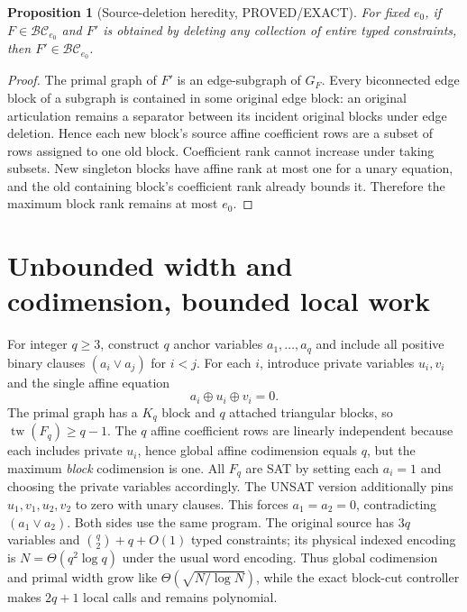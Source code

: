 \documentclass[10pt]{article}
\newtheorem{proposition}[theorem]{Proposition}
\newcommand{\tw}{\operatorname{tw}}
\begin{document}
\begin{proposition}[Source-deletion heredity, PROVED/EXACT]\label{prop:her}
For fixed $e_0$, if $F\in\mathcal{BC}_{e_0}$ and $F'$ is obtained by deleting any collection of entire typed constraints, then $F'\in\mathcal{BC}_{e_0}$.
\end{proposition}
\begin{proof}
The primal graph of $F'$ is an edge-subgraph of $G_F$. Every biconnected edge block of a subgraph is contained in some original edge block: an original articulation remains a separator between its incident original blocks under edge deletion. Hence each new block's source affine coefficient rows are a subset of rows assigned to one old block. Coefficient rank cannot increase under taking subsets. New singleton blocks have affine rank at most one for a unary equation, and the old containing block's coefficient rank already bounds it. Therefore the maximum block rank remains at most $e_0$.
\end{proof}

\section{Unbounded width and codimension, bounded local work}
For integer $q\ge3$, construct $q$ anchor variables $a_1,\dots,a_q$ and include all positive binary clauses $(a_i\vee a_j)$ for $i<j$. For each $i$, introduce private variables $u_i,v_i$ and the single affine equation
\[
 a_i\oplus u_i\oplus v_i=0.
\]
The primal graph has a $K_q$ block and $q$ attached triangular blocks, so $\tw(F_q)\ge q-1$. The $q$ affine coefficient rows are linearly independent because each includes private $u_i$, hence global affine codimension equals $q$, but the maximum \emph{block} codimension is one. All $F_q$ are SAT by setting each $a_i=1$ and choosing the private variables accordingly. The UNSAT version additionally pins $u_1,v_1,u_2,v_2$ to zero with unary clauses. This forces $a_1=a_2=0$, contradicting $(a_1\vee a_2)$. Both sides use the same program. The original source has $3q$ variables and $\binom q2+q+O(1)$ typed constraints; its physical indexed encoding is $N=\Theta(q^2\log q)$ under the usual word encoding. Thus global codimension and primal width grow like $\Theta(\sqrt{N/\log N})$, while the exact block-cut controller makes $2q+1$ local calls and remains polynomial.
\end{document}
